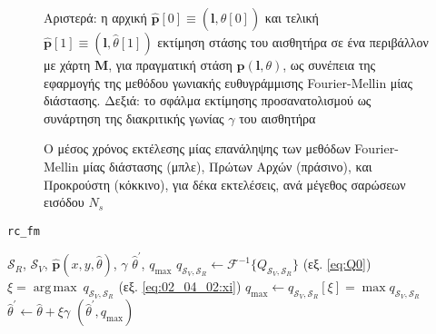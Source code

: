 \begin{figure}[!h]\centering
  \vspace{0.5cm}
  
  \vspace{0.5cm}
  \caption{\small Αριστερά: η αρχική
           $\hat{\bm{p}}[0] \equiv (\bm{l},\hat{\theta}[0])$ και τελική
           $\hat{\bm{p}}[1] \equiv (\bm{l},\hat{\theta}[1])$ εκτίμηση στάσης του
           αισθητήρα σε ένα περιβάλλον με χάρτη $\bm{M}$, για πραγματική στάση
           $\bm{p}(\bm{l},\theta)$, ως συνέπεια της εφαρμογής της μεθόδου
           γωνιακής ευθυγράμμισης Fourier-Mellin μίας διάστασης. Δεξιά: το
           σφάλμα εκτίμησης προσανατολισμού ως συνάρτηση της διακριτικής γωνίας
           $\gamma$ του αισθητήρα}
  \label{fig:02_04_02:rc_fm}
\end{figure}

\begin{figure}[!h]\centering
  
  \caption{\small Ο μέσος χρόνος εκτέλεσης μίας επανάληψης των μεθόδων
           Fourier-Mellin μίας διάστασης (μπλε), Πρώτων Αρχών (πράσινο), και
           Προκρούστη (κόκκινο), για δέκα εκτελέσεις, ανά μέγεθος
           σαρώσεων εισόδου $N_s$}
  \label{fig:02_04_02:exec_times_all_rotations_default}
\end{figure}

\begin{algorithm}[!h]
  \caption{\texttt{rc\_fm}}
  \label{alg:algorithm_fmrc}
  \begin{spacing}{1.3}
  \begin{algorithmic}[1]
    \REQUIRE $\mathcal{S}_R$, $\mathcal{S}_V$, $\hat{\bm{p}}(x, y, \hat{\theta})$, $\gamma$
    \ENSURE $\hat{\theta}^\prime$, $q_{\max}$
    \STATE $q_{\mathcal{S}_V, \mathcal{S}_R} \leftarrow \mathcal{F}^{-1}\{Q_{\mathcal{S}_V, \mathcal{S}_R}\}$ \hfill (εξ. \ref{eq:Q0})
    \STATE $\xi = \operatorname*{arg\,max} \ q_{\mathcal{S}_V, \mathcal{S}_R}$                                \hfill (εξ. \ref{eq:02_04_02:xi})
    \STATE $q_{\max} \leftarrow q_{\mathcal{S}_V, \mathcal{S}_R}[\xi] = \max q_{\mathcal{S}_V, \mathcal{S}_R}$
    \STATE $\hat{\theta}^\prime \leftarrow \hat{\theta} + \xi \gamma$
    \RETURN $(\hat{\theta}^\prime, q_{\max})$
  \end{algorithmic}
  \end{spacing}
\end{algorithm}


